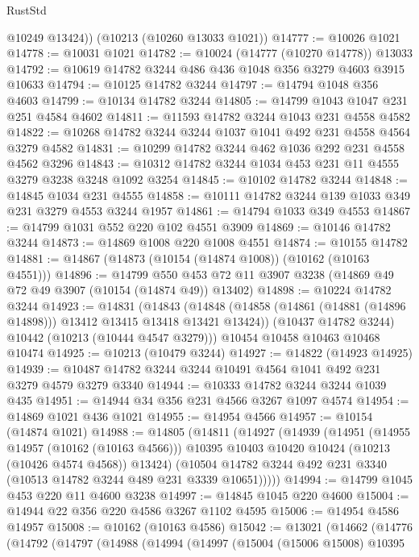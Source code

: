 \begin{lexlean}{RustStd}
\begin{coremodule}
        @10249
        @13424))
    (@10213 (@10260 @13033 @1021))
@14777 := @10026 @1021
@14778 := @10031 @1021
@14782 := @10024 (@14777 (@10270 @14778)) @13033
@14792 := @10619 @14782 @3244 @486 @436 @1048 @356 @3279 @4603 @3915 @10633
@14794 := @10125 @14782 @3244
@14797 := @14794 @1048 @356 @4603
@14799 := @10134 @14782 @3244
@14805 := @14799 @1043 @1047 @231 @251 @4584 @4602
@14811 := @11593 @14782 @3244 @1043 @231 @4558 @4582
@14822 := @10268 @14782 @3244 @3244 @1037 @1041 @492 @231 @4558 @4564 @3279 @4582
@14831 := @10299 @14782 @3244 @462 @1036 @292 @231 @4558 @4562 @3296
@14843 := @10312 @14782 @3244 @1034 @453 @231 @11 @4555 @3279 @3238 @3248 @1092 @3254
@14845 := @10102 @14782 @3244
@14848 := @14845 @1034 @231 @4555
@14858 := @10111 @14782 @3244 @139 @1033 @349 @231 @3279 @4553 @3244 @1957
@14861 := @14794 @1033 @349 @4553
@14867 := @14799 @1031 @552 @220 @102 @4551 @3909
@14869 := @10146 @14782 @3244
@14873 := @14869 @1008 @220 @1008 @4551
@14874 := @10155 @14782
@14881 := @14867 (@14873 (@10154 (@14874 @1008)) (@10162 (@10163 @4551)))
@14896 := @14799
    @550
    @453
    @72
    @11
    @3907
    @3238
    (@14869 @49 @72 @49 @3907 (@10154 (@14874 @49)) @13402)
@14898 := @10224 @14782 @3244
@14923 := @14831
    (@14843
      (@14848 (@14858 (@14861 (@14881 (@14896 @14898))) @13412 @13415 @13418 @13421 @13424))
      (@10437 @14782 @3244)
      @10442
      (@10213 (@10444 @4547 @3279)))
    @10454
    @10458
    @10463
    @10468
    @10474
@14925 := @10213 (@10479 @3244)
@14927 := @14822 (@14923 @14925)
@14939 := @10487 @14782 @3244 @3244 @10491 @4564 @1041 @492 @231 @3279 @4579 @3279 @3340
@14944 := @10333 @14782 @3244 @3244 @1039 @435
@14951 := @14944 @34 @356 @231 @4566 @3267 @1097 @4574
@14954 := @14869 @1021 @436 @1021
@14955 := @14954 @4566
@14957 := @10154 (@14874 @1021)
@14988 := @14805
    (@14811
      (@14927
        (@14939
          (@14951
            (@14955 @14957 (@10162 (@10163 @4566)))
            @10395
            @10403
            @10420
            @10424
            (@10213 (@10426 @4574 @4568))
            @13424)
          (@10504 @14782 @3244 @492 @231 @3340 (@10513 @14782 @3244 @489 @231 @3339 @10651)))))
@14994 := @14799 @1045 @453 @220 @11 @4600 @3238
@14997 := @14845 @1045 @220 @4600
@15004 := @14944 @22 @356 @220 @4586 @3267 @1102 @4595
@15006 := @14954 @4586 @14957
@15008 := @10162 (@10163 @4586)
@15042 := @13021
    (@14662
      (@14776
        (@14792
          (@14797
            (@14988
              (@14994
                (@14997
                  (@15004
                    (@15006 @15008)
                    @10395

\end{coremodule}
\end{lexlean}
